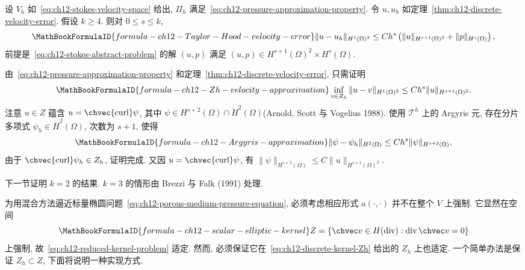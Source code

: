 \begin{Theorem}
\label{thm:ch12-Taylor-Hood-velocity-error}
设 $V_h$ 如~\eqref{eq:ch12-stokes-velocity-space} 给出, $\Pi_h$ 满足~\eqref{eq:ch12-pressure-approximation-property}. 令 $u,u_h$ 如定理~\ref{thm:ch12-discrete-velocity-error}. 假设 $k\geq4$. 则对 $0\leq s\leq k$,
\[
\MathBookFormulaID{formula-ch12-Taylor-Hood-velocity-error}
\|u-u_h\|_{H^1(\Omega)^2}
\leq Ch^s\left(\|u\|_{H^{s+1}(\Omega)^2}
+\|p\|_{H^s(\Omega)}\right),
\]
前提是~\eqref{eq:ch12-stokes-abstract-problem} 的解 $(u,p)$ 满足
$(u,p)\in H^{s+1}(\Omega)^2\times H^s(\Omega)$.
\end{Theorem}

\begin{Proof}
由~\eqref{eq:ch12-pressure-approximation-property} 和定理~\ref{thm:ch12-discrete-velocity-error}, 只需证明
\begin{equation}
\MathBookFormulaID{formula-ch12-Zh-velocity-approximation}
\label{eq:ch12-Zh-velocity-approximation}
\inf_{v\in Z_h}\|u-v\|_{H^1(\Omega)^2}
\leq Ch^s\|u\|_{H^{s+1}(\Omega)^2}.
\end{equation}
注意 $u\in Z$ 蕴含 $u=\chvec{\operatorname{curl}}\psi$, 其中
$\psi\in H^{s+2}(\Omega)\cap\mathring H^2(\Omega)$(Arnold, Scott 与 Vogelius 1988). 使用 $\mathcal T^h$ 上的 Argyris 元, 存在分片多项式 $\psi_h\in\mathring H^2(\Omega)$, 次数为 $s+1$, 使得
\[
\MathBookFormulaID{formula-ch12-Argyris-approximation}
\|\psi-\psi_h\|_{H^2(\Omega)}
\leq Ch^s\|\psi\|_{H^{s+2}(\Omega)}.
\]
由于 $\chvec{\operatorname{curl}}\psi_h\in Z_h$, 证明完成. 又因 $u=\chvec{\operatorname{curl}}\psi$, 有
$\|\psi\|_{H^{s+2}(\Omega)}\leq C\|u\|_{H^{s+1}(\Omega)^2}$.
\end{Proof}

\begin{Remark}
\label{rem:ch12-k3-velocity}
下一节证明 $k=2$ 的结果. $k=3$ 的情形由 Brezzi 与 Falk (1991) 处理.
\end{Remark}

为用混合方法逼近标量椭圆问题~\eqref{eq:ch12-porous-medium-pressure-equation}, 必须考虑相应形式 $a(\cdot,\cdot)$ 并不在整个 $V$ 上强制. 它显然在空间
\[
\MathBookFormulaID{formula-ch12-scalar-elliptic-kernel}
Z=\{\chvec v\in H(\operatorname{div}):\operatorname{div}\chvec v=0\}
\]
上强制, 故~\eqref{eq:ch12-reduced-kernel-problem} 适定. 然而, 必须保证它在~\eqref{eq:ch12-discrete-kernel-Zh} 给出的 $Z_h$ 上也适定. 一个简单办法是保证 $Z_h\subset Z$, 下面将说明一种实现方式.

